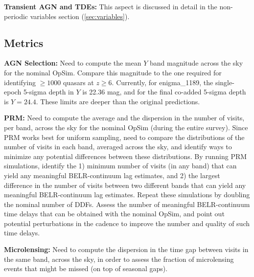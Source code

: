 {\bf Transient AGN and TDEs:} This aspect is discussed in detail in
the non-periodic variables section (\autoref{sec:variables}).


\subsection{Metrics}
\label{sec:\secname:metrics}


{\bf AGN Selection:} Need to compute the mean $Y$ band magnitude
across the sky for the nominal OpSim. Compare this magnitude to the
one required for identifying $\geq1000$ quasars at $z\geq6$.
Currently, for enigma\_1189, the single-epoch 5-sigma depth in $Y$
is 22.36 mag, and for the final co-added 5-sigma depth is $Y=24.4$.
These limits are deeper than the original predictions.

{\bf PRM:} Need to compute the average and the dispersion in the
number of visits, per band, across the sky for the nominal OpSim
(during the entire survey). Since PRM works best for uniform sampling,
need to compare the distributions of the number of visits in each
band, averaged across the sky, and identify ways to minimize any
potential differences between these distributions. By running PRM
simulations, identify the 1) minimum number of visits (in any band)
that can yield any meaningful BELR-continuum lag estimates, and 2) the
largest difference in the number of visits between two different bands
that can yield any meaningful BELR-continuum lag estimates. Repeat
these simulations by doubling the nominal number of DDFs. Assess the
number of meaningful BELR-continuum time delays that can be obtained
with the nominal OpSim, and point out potential perturbations in the
cadence to improve the number and quality of such time delays.

{\bf Microlensing:} Need to compute the dispersion in the time gap
between visits in the same band, across the sky, in order to assess
the fraction of microlensing events that might be missed (on top of
seasonal gaps).

